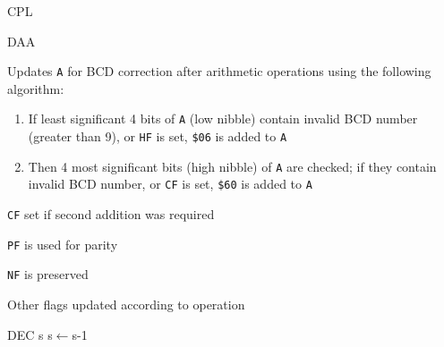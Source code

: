 \documentclass[twoside,openright,a4paper]{book}
\begin{document}
\begin{basedescript}{
	\desclabelstyle{\multilinelabel}
	\desclabelwidth{3cm}}
\begin{detailitem}{CPL}
		\begin{DetailTiming}
		\end{DetailTiming}

	\end{detailitem}

	\begin{detailitem}{DAA}
		{}

		Updates {\tt A} for BCD correction after arithmetic operations using the following algorithm:

		\begin{enumerate}
			\item If least significant 4 bits of {\tt A} (low nibble) contain invalid BCD number (greater than 9), or {\tt HF} is set, {\tt \$06} is added to {\tt A}
			\item Then 4 most significant bits (high nibble) of {\tt A} are checked; if they contain invalid BCD number, or {\tt CF} is set, {\tt \$60} is added to {\tt A}
		\end{enumerate}

		\begin{DetailEffects}
			\item {\tt CF} set if second addition was required
			\item {\tt PF} is used for parity
			\item {\tt NF} is preserved
			\item Other flags updated according to operation
		\end{DetailEffects}
		
		\begin{DetailTiming}
			\DetailTime{}{1}{4}
		\end{DetailTiming}

	\end{detailitem}

	\pagebreak
	\begin{detailitem}{DEC s}
		{s$\leftarrow$s-1}


\end{detailitem}
\end{basedescript}
\end{document}
